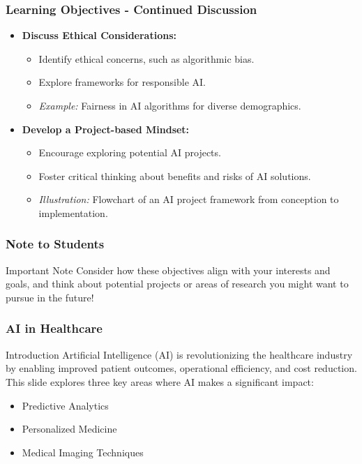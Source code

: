 \documentclass[aspectratio=169]{beamer}
\begin{document}
\begin{frame}[fragile]
    \frametitle{Learning Objectives - Continued Discussion}
    \begin{itemize}
        \item \textbf{Discuss Ethical Considerations:}
        \begin{itemize}
            \item Identify ethical concerns, such as algorithmic bias.
            \item Explore frameworks for responsible AI.
            \item \textit{Example:} Fairness in AI algorithms for diverse demographics.
        \end{itemize}
        
        \item \textbf{Develop a Project-based Mindset:}
        \begin{itemize}
            \item Encourage exploring potential AI projects.
            \item Foster critical thinking about benefits and risks of AI solutions.
            \item \textit{Illustration:} Flowchart of an AI project framework from conception to implementation.
        \end{itemize}
    \end{itemize}
\end{frame}

\begin{frame}[fragile]
    \frametitle{Note to Students}
    \begin{block}{Important Note}
        Consider how these objectives align with your interests and goals, and think about potential projects or areas of research you might want to pursue in the future!
    \end{block}
\end{frame}

\begin{frame}[fragile]
  \frametitle{AI in Healthcare}
  \begin{block}{Introduction}
    Artificial Intelligence (AI) is revolutionizing the healthcare industry by enabling improved patient outcomes, operational efficiency, and cost reduction. 
    This slide explores three key areas where AI makes a significant impact:
    \begin{itemize}
        \item Predictive Analytics
        \item Personalized Medicine
        \item Medical Imaging Techniques
    \end{itemize}
  \end{block}
\end{frame}
\end{document}
